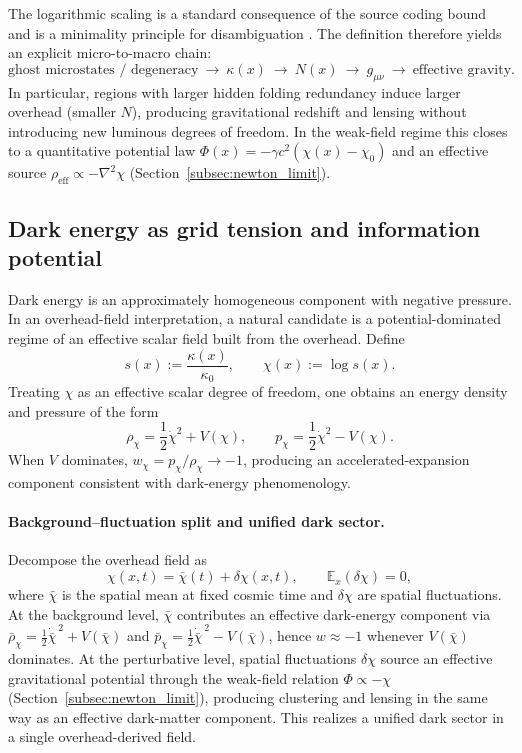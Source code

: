 The logarithmic scaling is a standard consequence of the source coding bound and is a minimality principle for disambiguation \cite{CoverThomas2006}.
The definition therefore yields an explicit micro-to-macro chain:
\[
\text{ghost microstates / degeneracy}\ \longrightarrow\ \kappa(x)\ \longrightarrow\ N(x)\ \longrightarrow\ g_{\mu\nu}\ \longrightarrow\ \text{effective gravity}.
\]
In particular, regions with larger hidden folding redundancy induce larger overhead (smaller $N$), producing gravitational redshift and lensing without introducing new luminous degrees of freedom.
In the weak-field regime this closes to a quantitative potential law $\Phi(x)=-\gamma c^2(\chi(x)-\chi_0)$ and an effective source $\rho_{\mathrm{eff}}\propto -\nabla^2\chi$ (Section~\ref{subsec:newton_limit}).

\subsection{Dark energy as grid tension and information potential}
\label{subsec:de_grid_tension}

Dark energy is an approximately homogeneous component with negative pressure.
In an overhead-field interpretation, a natural candidate is a potential-dominated regime of an effective scalar field built from the overhead.
Define
\[
s(x):=\frac{\kappa(x)}{\kappa_0},
\qquad
\chi(x):=\log s(x).
\]
Treating $\chi$ as an effective scalar degree of freedom, one obtains an energy density and pressure of the form
\[
\rho_\chi=\frac{1}{2}\dot{\chi}^2+V(\chi),
\qquad
p_\chi=\frac{1}{2}\dot{\chi}^2-V(\chi).
\]
\cite{Dodelson2003}
When $V$ dominates, $w_\chi=p_\chi/\rho_\chi\to -1$, producing an accelerated-expansion component consistent with dark-energy phenomenology.

\paragraph{Background--fluctuation split and unified dark sector.}
Decompose the overhead field as
\[
\chi(x,t)=\bar{\chi}(t)+\delta\chi(x,t),
\qquad \mathbb{E}_x(\delta\chi)=0,
\]
where $\bar{\chi}$ is the spatial mean at fixed cosmic time and $\delta\chi$ are spatial fluctuations.
At the background level, $\bar{\chi}$ contributes an effective dark-energy component via $\bar\rho_\chi=\frac{1}{2}\dot{\bar\chi}^{\,2}+V(\bar\chi)$ and $\bar p_\chi=\frac{1}{2}\dot{\bar\chi}^{\,2}-V(\bar\chi)$, hence $w\approx -1$ whenever $V(\bar\chi)$ dominates.
At the perturbative level, spatial fluctuations $\delta\chi$ source an effective gravitational potential through the weak-field relation $\Phi\propto -\chi$ (Section~\ref{subsec:newton_limit}), producing clustering and lensing in the same way as an effective dark-matter component.
This realizes a unified dark sector in a single overhead-derived field.

